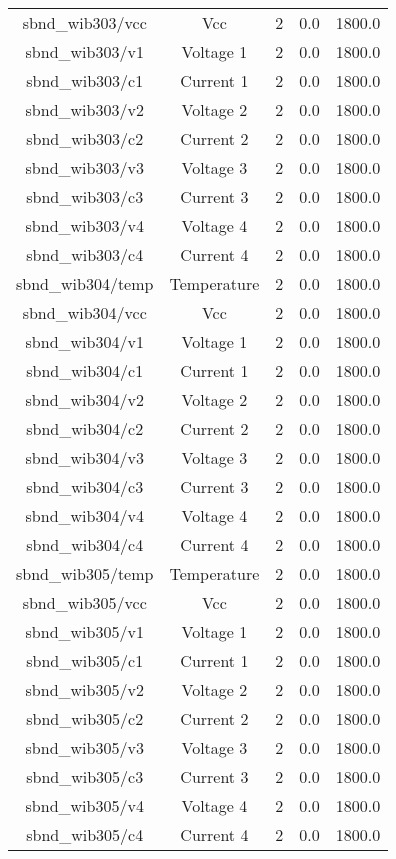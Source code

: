 \begin{center}
\begin{longtable}{c | c c c c }
sbnd\_wib303/vcc & Vcc & 2 & 0.0 & 1800.0\\ 
sbnd\_wib303/v1 & Voltage 1 & 2 & 0.0 & 1800.0\\ 
sbnd\_wib303/c1 & Current 1 & 2 & 0.0 & 1800.0\\ 
sbnd\_wib303/v2 & Voltage 2 & 2 & 0.0 & 1800.0\\ 
sbnd\_wib303/c2 & Current 2 & 2 & 0.0 & 1800.0\\ 
sbnd\_wib303/v3 & Voltage 3 & 2 & 0.0 & 1800.0\\ 
sbnd\_wib303/c3 & Current 3 & 2 & 0.0 & 1800.0\\ 
sbnd\_wib303/v4 & Voltage 4 & 2 & 0.0 & 1800.0\\ 
sbnd\_wib303/c4 & Current 4 & 2 & 0.0 & 1800.0\\ 
sbnd\_wib304/temp & Temperature & 2 & 0.0 & 1800.0\\ 
sbnd\_wib304/vcc & Vcc & 2 & 0.0 & 1800.0\\ 
sbnd\_wib304/v1 & Voltage 1 & 2 & 0.0 & 1800.0\\ 
sbnd\_wib304/c1 & Current 1 & 2 & 0.0 & 1800.0\\ 
sbnd\_wib304/v2 & Voltage 2 & 2 & 0.0 & 1800.0\\ 
sbnd\_wib304/c2 & Current 2 & 2 & 0.0 & 1800.0\\ 
sbnd\_wib304/v3 & Voltage 3 & 2 & 0.0 & 1800.0\\ 
sbnd\_wib304/c3 & Current 3 & 2 & 0.0 & 1800.0\\ 
sbnd\_wib304/v4 & Voltage 4 & 2 & 0.0 & 1800.0\\ 
sbnd\_wib304/c4 & Current 4 & 2 & 0.0 & 1800.0\\ 
sbnd\_wib305/temp & Temperature & 2 & 0.0 & 1800.0\\ 
sbnd\_wib305/vcc & Vcc & 2 & 0.0 & 1800.0\\ 
sbnd\_wib305/v1 & Voltage 1 & 2 & 0.0 & 1800.0\\ 
sbnd\_wib305/c1 & Current 1 & 2 & 0.0 & 1800.0\\ 
sbnd\_wib305/v2 & Voltage 2 & 2 & 0.0 & 1800.0\\ 
sbnd\_wib305/c2 & Current 2 & 2 & 0.0 & 1800.0\\ 
sbnd\_wib305/v3 & Voltage 3 & 2 & 0.0 & 1800.0\\ 
sbnd\_wib305/c3 & Current 3 & 2 & 0.0 & 1800.0\\ 
sbnd\_wib305/v4 & Voltage 4 & 2 & 0.0 & 1800.0\\ 
sbnd\_wib305/c4 & Current 4 & 2 & 0.0 & 1800.0\\ 

\end{longtable}
\end{center}
